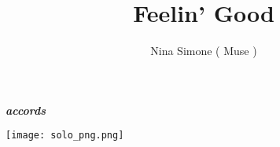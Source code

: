 \documentclass[a4paper, 10 pt]{article}
\title{Feelin' Good}
\author{Nina Simone ( Muse ) }
\date{}
\newcommand{\couplet}[1]{
    \colorbox{bg}{
        \Fontskrivan\bfseries\slshape
        \fontsize{10pt}{50pt}\selectfont
        #1
    }

}
\begin{document}
{
    \Fontskrivan\bfseries\slshape
    \fontsize{10pt}{50pt}\selectfont
    \color{blue}
    \maketitle

}

    \begin{Row}
        \begin{Cell}{1}
            
        \end{Cell}
        \begin{Cell}{1}
            
        \end{Cell}
    \end{Row}

    \begin{Row}
        \begin{Cell}{1}
            \couplet{accords}
            \begin{center}
                \texttt{[image: solo\_png.png]}
            \end{center}
        \end{Cell}
    \end{Row}
\end{document}
